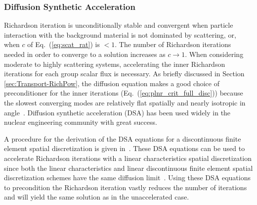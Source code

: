 \subsubsection{Diffusion Synthetic Acceleration}
\label{sec:Transport-RichPow-DSA}

\noindent
	\indent Richardson iteration is unconditionally stable and convergent when particle
	interaction with the background material is not dominated by scattering, or, when ${c}$
	of Eq.~(\ref{eq:scat_rat}) is ${< 1}$.  The number of Richardson iterations needed in 
	order to converge to a solution increases as ${c\rightarrow1}$.  When
	considering moderate to highly scattering systems, accelerating the inner Richardson
	iterations for each group scalar flux is necessary.  As  briefly discussed in Section
	\ref{sec:Transport-RichPow}, the diffusion equation makes a good choice of preconditioner
	for the inner iterations (Eq.~(\ref{eq:plnr_crit_full_disc})) because the slowest converging
	modes are relatively flat spatially and nearly isotropic in angle~\cite{Ada:04}.  Diffusion
	synthetic acceleration (DSA) has been used widely in the nuclear engineering community
	with great success.  
	
\noindent
	\indent A procedure for the derivation of the DSA equations for a discontinuous finite
	element spatial discretization is given in~\cite{Ada:92}.  These DSA equations
	can be used to accelerate Richardson iterations
	with a linear characteristics spatial discretization since both the linear characteristics and 
	linear discontinuous finite element spatial discretization schemes have the same diffusion
	limit~\cite{Ada:98}.  Using these DSA equations to precondition the Richardson iteration vastly
	reduces the number of iterations and will yield the same solution as in the unaccelerated case.
	

